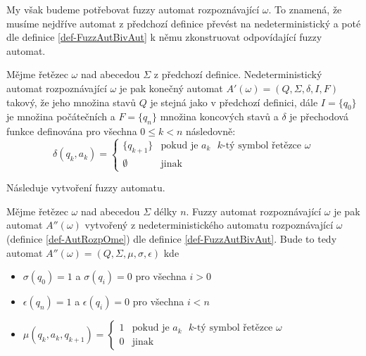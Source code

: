 \documentclass[a4paper,10pt]{article}
\begin{document}
My však budeme potřebovat fuzzy automat rozpoznávající $\omega$. To znamená, že musíme nejdříve automat z předchozí definice převést na nedeterministický a poté dle definice \ref{def-FuzzAutBivAut} k němu zkonstruovat odpovídající fuzzy automat.

\begin{definition} \label{def-AutRozpOme}
  Mějme řetězec $\omega$ nad abecedou $\Sigma$ z předchozí definice. Nedeterministický automat rozpoznávající $\omega$ je pak konečný automat $A'(\omega) = ( Q, \Sigma, \delta, I, F )$ takový, že jeho množina stavů $Q$ je stejná jako v předchozí definici, dále $I = \{ q_0 \}$ je množina počátečních a $F = \{ q_n \}$ množina koncových stavů a $\delta$ je přechodová funkce definována pro všechna $0 \leq k < n$ následovně:
  $$
  \delta(q_{k}, a_k) = 
  \begin{cases}
      \{ q_{k+1} \}	&\text{pokud je $a_k$ $k$-tý symbol řetězce $\omega$} \\
      \emptyset	&\text{jinak}
  \end{cases}
  $$
\end{definition}

Následuje vytvoření fuzzy automatu.

\begin{definition} \label{def-FuzzAutRozpOme}
  Mějme řetězec $\omega$ nad abecedou $\Sigma$ délky $n$. Fuzzy automat rozpoznávající $\omega$ je pak automat $A''(\omega)$ vytvořený z nedeterministického automatu rozpoznávající $\omega$ (definice \ref{def-AutRozpOme}) dle definice \ref{def-FuzzAutBivAut}. Bude to tedy automat $A''(\omega) = ( Q, \Sigma, \mu, \sigma, \epsilon )$ kde
  \begin{itemize}
   \item $\sigma(q_0) = 1$ a $\sigma(q_i) = 0$ pro všechna $i > 0$
   \item $\epsilon(q_n) = 1$ a $\epsilon(q_i) = 0$ pro všechna $i < n$
   \item $\mu(q_{k}, a_k, q_{k+1}) = 
      \begin{cases}
	1		&\text{pokud je $a_k$ $k$-tý symbol řetězce $\omega$} \\
	0		&\text{jinak}
      \end{cases}
      $
  \end{itemize}
\end{definition}
\end{document}
